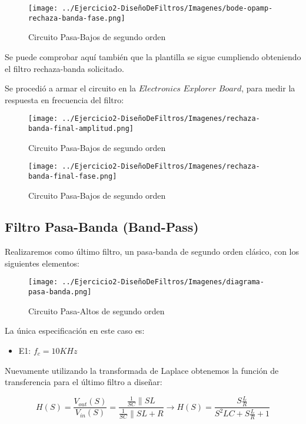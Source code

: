 \begin{figure}[H]
    \centering
    \texttt{[image: ../Ejercicio2-DiseñoDeFiltros/Imagenes/bode-opamp-rechaza-banda-fase.png]}
    \caption{Circuito Pasa-Bajos de segundo orden}
\end{figure}

Se puede comprobar aquí también que la plantilla se sigue cumpliendo obteniendo el filtro rechaza-banda solicitado.

Se procedió a armar el circuito en la $Electronics$ $Explorer$ $Board$, para medir la respuesta en frecuencia del filtro:

\begin{figure}[H]
    \centering
    \texttt{[image: ../Ejercicio2-DiseñoDeFiltros/Imagenes/rechaza-banda-final-amplitud.png]}
    \caption{Circuito Pasa-Bajos de segundo orden}
\end{figure}

\begin{figure}[H]
    \centering
    \texttt{[image: ../Ejercicio2-DiseñoDeFiltros/Imagenes/rechaza-banda-final-fase.png]}
    \caption{Circuito Pasa-Bajos de segundo orden}
\end{figure}


\subsection{Filtro Pasa-Banda (Band-Pass)}

Realizaremos como último filtro, un pasa-banda de segundo orden clásico, con los siguientes elementos:

\begin{figure}[H]
    \centering
    \texttt{[image: ../Ejercicio2-DiseñoDeFiltros/Imagenes/diagrama-pasa-banda.png]}
    \caption{Circuito Pasa-Altos de segundo orden}
\end{figure}

La única especificación en este caso es:

\begin{itemize}
	\item E1: $f_c=10 KHz$
\end{itemize}

Nuevamente utilizando la transformada de Laplace obtenemos la función de transferencia para el último filtro
a diseñar:

$$H(S)=\frac{V_{out}(S)}{V_{in}(S)}=\frac{\frac{1}{SC}\parallel SL}{\frac{1}{SC}\parallel SL + R} \longrightarrow 
H(S)=\frac{S\frac{L}{R}}{S^2LC+S\frac{L}{R}+1}$$

